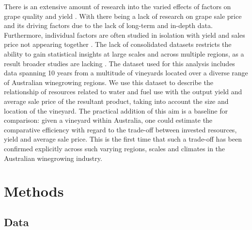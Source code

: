 \documentclass[review,12pt,authoryear]{elsarticle}
\begin{document}
\begin{linenumbers}
There is an extensive amount of research into the varied effects of factors on grape quality and yield \citep{heFruitYieldPrediction2022,laurentLocalInfluenceClimate2022,liakosMachineLearningAgriculture2018}. With there being a lack of research on grape sale price and its driving factors due to the lack of long-term and in-depth data. Furthermore, individual factors are often studied in isolation with yield and sales price not appearing together \citep{abbalDecisionSupportSystem2016}. The lack of consolidated datasets restricts the ability to gain statistical insights at large scales and across multiple regions, as a result broader studies are lacking \citep{keithjonesAustralianWineIndustry2002,knightFirmResourcesDevelopment2019}. The dataset used for this analysis includes data spanning 10 years from a multitude of vineyards located over a diverse range of Australian winegrowing regions. We use this dataset to describe the relationship of resources related to water and fuel use with the output yield and average sale price of the resultant product, taking into account the size and location of the vineyard. The practical addition of this aim is a baseline for comparison: given a vineyard within Australia, one could estimate the comparative efficiency with regard to the trade-off between invested resources, yield and average sale price. This is the first time that such a trade-off has been confirmed explicitly across such varying regions, scales and climates in the Australian winegrowing industry.
\section{Methods}
\subsection{Data}


\end{linenumbers}
\end{document}
